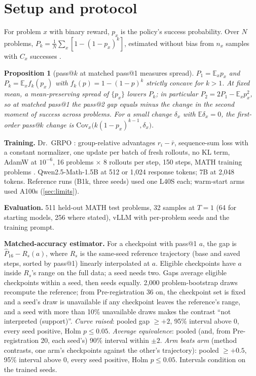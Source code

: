 \documentclass{article}
\theoremstyle{plain}
\newtheorem{proposition}[theorem]{Proposition}
\newcommand{\E}{\mathbb E}
\begin{document}
\section{Setup and protocol}\label{sec:setup}
For problem $x$ with binary reward, $p_x$ is the policy's success probability. Over $N$ problems,
$P_k=\frac1N\sum_x[1-(1-p_x)^k]$, estimated without bias from $n_x$ samples with $C_x$ successes
\citep{chen2021codex}.

\begin{proposition}[pass@$k$ at matched pass@1 measures spread]\label{prop:spread}
$P_1=\E_xp_x$ and $P_k=\E_xf_k(p_x)$ with $f_k(p)=1-(1-p)^k$ strictly concave for $k>1$. At fixed mean, a
mean-preserving spread of $\{p_x\}$ lowers $P_k$; in particular $P_2=2P_1-\E_xp_x^2$, so at matched pass@1 the
pass@2 gap equals minus the change in the second moment of success across problems. For a small change $\delta_x$ with
$\E\delta_x=0$, the first-order pass@$k$ change is $\mathrm{Cov}_x\big(k(1-p_x)^{k-1},\delta_x\big)$.
\end{proposition}

\textbf{Training.} Dr.\ GRPO \citep{liu2025drgrpo}: group-relative advantages $r_i-\bar r$, sequence-sum loss with a
constant normalizer, one update per batch of fresh rollouts, no KL term, AdamW at $10^{-6}$, 16 problems $\times$ 8
rollouts per step, 150 steps, MATH training problems \citep{hendrycks2021math}. Qwen2.5-Math-1.5B
\citep{yang2024qwen25math} at 512 or 1,024 response tokens; 7B at 2,048 tokens. Reference runs (B1k, three seeds)
used one L40S each; warm-start arms used A100s (\cref{sec:limits}).

\textbf{Evaluation.} 511 held-out MATH test problems, 32 samples at $T=1$ (64 for starting models, 256 where stated),
vLLM with per-problem seeds and the training prompt.

\textbf{Matched-accuracy estimator.} For a checkpoint with pass@1 $a$, the gap is $\widehat P_{16}-R_s(a)$, where $R_s$
is the same-seed reference trajectory (base and saved steps, sorted by pass@1) linearly interpolated at $a$.
Eligible checkpoints have $a$ inside $R_s$'s range on the full data; a seed needs two. Gaps average eligible
checkpoints within a seed, then seeds equally. 2,000 problem-bootstrap draws recompute the reference; from
Pre-registration 36 on, the checkpoint set is fixed and a seed's draw is unavailable if any checkpoint leaves the
reference's range, and a seed with more than 10\% unavailable draws makes the contrast ``not interpreted (support)''.
\emph{Curve raised}: pooled gap $\ge+2$, 95\% interval above 0, every seed positive, Holm $p\le0.05$.
\emph{Average equivalence}: pooled (and, from Pre-registration 20, each seed's) 90\% interval within $\pm2$.
\emph{Arm beats arm} (method contrasts, one arm's checkpoints against the other's trajectory): pooled $\ge+0.5$, 95\%
interval above 0, every seed positive, Holm $p\le0.05$. Intervals condition on the trained seeds.
\end{document}
